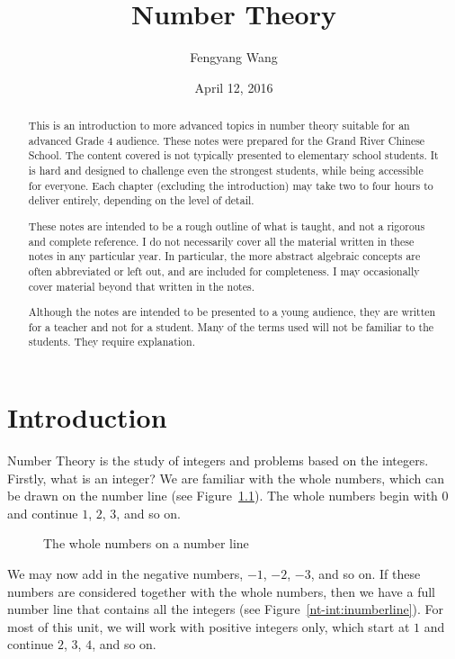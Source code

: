 \documentclass[a4paper,10pt]{report}
\title{Number Theory}
\author{Fengyang Wang}
\date{April 12, 2016}
\begin{document}
\begin{abstract}

This is an introduction to more advanced topics in number theory suitable for an
advanced Grade 4 audience. These notes were prepared for the Grand River Chinese
School. The content covered is not typically presented to elementary school
students. It is hard and designed to challenge even the strongest students,
while being accessible for everyone. Each chapter (excluding the introduction)
may take two to four hours to deliver entirely, depending on the level of
detail.

These notes are intended to be a rough outline of what is taught, and not a
rigorous and complete reference. I do not necessarily cover all the material
written in these notes in any particular year. In particular, the more abstract
algebraic concepts are often abbreviated or left out, and are included for
completeness. I may occasionally cover material beyond that written in the
notes.

Although the notes are intended to be presented to a young audience, they are
written for a teacher and not for a student. Many of the terms used will not be
familiar to the students. They require explanation.

\end{abstract}

\maketitle

\tableofcontents

\chapter{Introduction}

Number Theory is the study of \glspl{integer} and problems based on the
integers. Firstly, what is an integer? We are familiar with the whole numbers,
which can be drawn on the number line (see Figure~\ref{nt-int:pnumberline}). The
whole numbers begin with $0$ and continue $1$, $2$, $3$, and so on.

\begin{figure}

 \caption{The whole numbers on a number line}
 \label{nt-int:pnumberline}
\end{figure}

We may now add in the negative numbers, $-1$, $-2$, $-3$, and so on. If these
numbers are considered together with the whole numbers, then we have a full
number line that contains all the integers (see
Figure~\ref{nt-int:inumberline}). For most of this unit, we will work with
positive integers only, which start at $1$ and continue $2$, $3$, $4$, and so
on.
\end{document}
